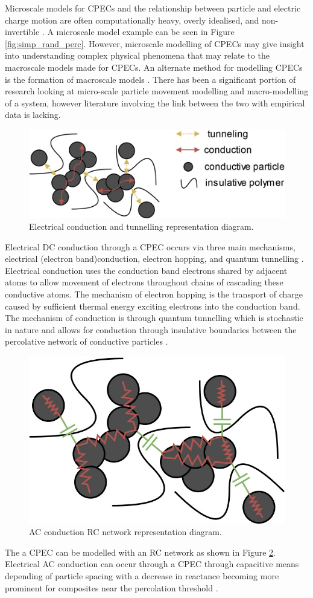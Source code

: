 Microscale models for CPECs and the relationship between particle and electric charge motion are often computationally heavy, overly idealised, and non-invertible \cite{Wang2022}. A microscale model example can be seen in Figure \ref{fig:simp_rand_perc}. However, microscale modelling of CPECs may give insight into understanding complex physical phenomena that may relate to the macroscale models made for CPECs. An alternate method for modelling CPECs is the formation of macroscale models \cite{Neffati2019}. There has been a significant portion of research looking at micro-scale particle movement modelling and macro-modelling of a system, however literature involving the link between the two with empirical data is lacking.
\begin{figure}[H]
	\centering
	\includegraphics[width=0.7\linewidth]{Figures/conduction-tunneling-mechanisms.jpg}
	\caption{Electrical conduction and tunnelling representation diagram.}
	\label{fig:tunneling-model-rep}
\end{figure}
Electrical DC conduction through a CPEC occurs via three main mechanisms, electrical (electron band)conduction, electron hopping, and quantum tunnelling \cite{Bloor2006,Duan2014,Zhang2007,Madrid2017,Devaraj2018}. Electrical conduction uses the conduction band electrons shared by adjacent atoms to allow movement of electrons throughout chains of cascading these conductive atoms. The mechanism of electron hopping is the transport of charge caused by sufficient thermal energy exciting electrons into the conduction band. The mechanism of conduction is through quantum tunnelling which is stochastic in nature and allows for conduction through insulative boundaries between the percolative network of conductive particles \cite{Hu2008,Grimaldi2006}. 
\begin{figure}[H]
	\centering
	\includegraphics[width=0.4\linewidth]{Figures/conduction-AC-mechanisms.jpg}
	\caption{AC conduction RC network representation diagram.}
	\label{fig:AC-model-rep}
\end{figure}
The a CPEC can be modelled with an RC network as shown in Figure \ref{fig:AC-model-rep}. Electrical AC conduction can occur through a CPEC through capacitive means depending of particle spacing with a decrease in reactance becoming more prominent for composites near the percolation threshold \cite{HindermannBischoff2001,Ilgaz2021,Buketov2020}.



